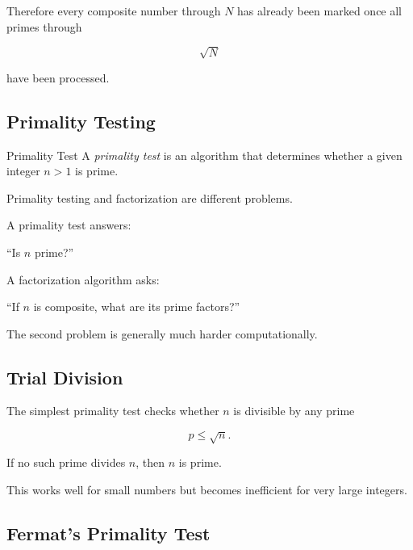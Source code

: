 Therefore every composite number through \(N\) has already been marked once
all primes through

\[ \sqrt N \]

have been processed.

\subsection{Primality Testing}
\label{subsec:primality-testing}

\begin{definitionbox}{Primality Test}
A \emph{primality test} is an algorithm that determines whether a given
integer \(n>1\) is prime.
\end{definitionbox}

Primality testing and factorization are different problems.

A primality test answers:

\begin{center}
``Is \(n\) prime?''
\end{center}

A factorization algorithm asks:

\begin{center}
``If \(n\) is composite, what are its prime factors?''
\end{center}

The second problem is generally much harder computationally.

\subsection{Trial Division}
\label{subsec:trial-division-primality}

The simplest primality test checks whether \(n\) is divisible by any prime

\[ p\leq\sqrt n. \]

If no such prime divides \(n\), then \(n\) is prime.

This works well for small numbers but becomes inefficient for very large
integers.

\subsection{Fermat's Primality Test}
\label{subsec:fermat-primality-test}

